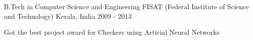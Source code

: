\begin{cventries}
  \cventry
    {B.Tech in Computer Science and Engineering}
    {FISAT (Federal Institute of Science and Technology)}
    {Kerala, India}
    {2009 - 2013}
    {
      \begin{cvitems}
        \item {Got the best project award for Checkers using Articial Neural Networks}
      \end{cvitems}
    }
\end{cventries}
